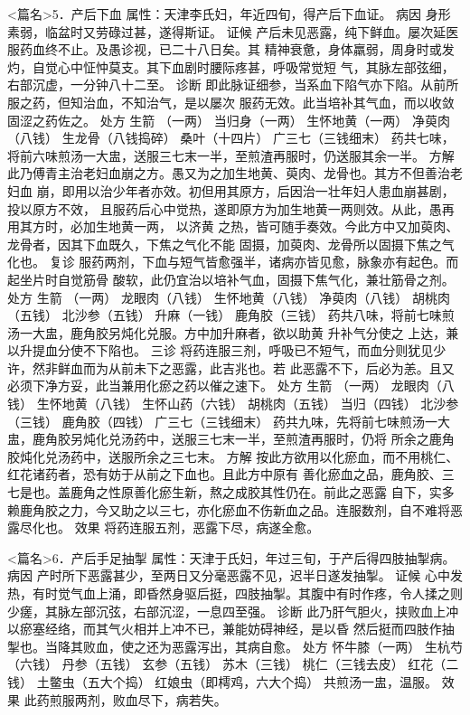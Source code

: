 \documentclass[a4paper,12pt,UTF8,twoside]{ctexbook}
\begin{document}
<篇名>5．产后下血
属性：天津李氏妇，年近四旬，得产后下血证。 
病因 身形素弱，临盆时又劳碌过甚，遂得斯证。 
证候 产后未见恶露，纯下鲜血。屡次延医服药血终不止。及愚诊视，已二十八日矣。其 
精神衰惫，身体羸弱，周身时或发灼，自觉心中怔忡莫支。其下血剧时腰际疼甚，呼吸常觉短 
气，其脉左部弦细，右部沉虚，一分钟八十二至。 
诊断 即此脉证细参，当系血下陷气亦下陷。从前所服之药，但知治血，不知治气，是以屡次 
服药无效。此当培补其气血，而以收敛固涩之药佐之。 
处方 生箭 （一两） 当归身（一两） 生怀地黄（一两） 净萸肉（八钱） 
生龙骨（八钱捣碎） 桑叶（十四片） 广三七（三钱细末） 
药共七味，将前六味煎汤一大盅，送服三七末一半，至煎渣再服时，仍送服其余一半。 
方解 此乃傅青主治老妇血崩之方。愚又为之加生地黄、萸肉、龙骨也。其方不但善治老妇血 
崩，即用以治少年者亦效。初但用其原方，后因治一壮年妇人患血崩甚剧，投以原方不效， 
且服药后心中觉热，遂即原方为加生地黄一两则效。从此，愚再用其方时，必加生地黄一两， 
以济黄 之热，皆可随手奏效。今此方中又加萸肉、龙骨者，因其下血既久，下焦之气化不能 
固摄，加萸肉、龙骨所以固摄下焦之气化也。 
复诊 服药两剂，下血与短气皆愈强半，诸病亦皆见愈，脉象亦有起色。而起坐片时自觉筋骨 
酸软，此仍宜治以培补气血，固摄下焦气化，兼壮筋骨之剂。 
处方 生箭 （一两） 龙眼肉（八钱） 生怀地黄（八钱） 净萸肉（八钱） 
胡桃肉（五钱） 北沙参（五钱） 升麻（一钱） 鹿角胶（三钱） 
药共八味，将前七味煎汤一大盅，鹿角胶另炖化兑服。方中加升麻者，欲以助黄 升补气分使之 
上达，兼以升提血分使不下陷也。 
三诊 将药连服三剂，呼吸已不短气，而血分则犹见少许，然非鲜血而为从前未下之恶露，此吉兆也。若 
此恶露不下，后必为恙。且又必须下净方妥，此当兼用化瘀之药以催之速下。 
处方 生箭 （一两） 龙眼肉（八钱） 生怀地黄（八钱） 生怀山药（六钱） 
胡桃肉（五钱） 当归（四钱） 北沙参（三钱） 鹿角胶（四钱） 
广三七（三钱细末） 
药共九味，先将前七味煎汤一大盅，鹿角胶另炖化兑汤药中，送服三七末一半，至煎渣再服时，仍将 
所余之鹿角胶炖化兑汤药中，送服所余之三七末。 
方解 按此方欲用以化瘀血，而不用桃仁、红花诸药者，恐有妨于从前之下血也。且此方中原有 
善化瘀血之品，鹿角胶、三七是也。盖鹿角之性原善化瘀生新，熬之成胶其性仍在。前此之恶露 
自下，实多赖鹿角胶之力，今又助之以三七，亦化瘀血不伤新血之品。连服数剂，自不难将恶露尽化也。 
效果 将药连服五剂，恶露下尽，病遂全愈。 


<篇名>6．产后手足抽掣
属性：天津于氏妇，年过三旬，于产后得四肢抽掣病。 
病因 产时所下恶露甚少，至两日又分毫恶露不见，迟半日遂发抽掣。 
证候 心中发热，有时觉气血上涌，即昏然身驱后挺，四肢抽掣。其腹中有时作疼，令人揉之则 
少瘥，其脉左部沉弦，右部沉涩，一息四至强。 
诊断 此乃肝气胆火，挟败血上冲以瘀塞经络，而其气火相并上冲不已，兼能妨碍神经，是以昏 
然后挺而四肢作抽掣也。当降其败血，使之还为恶露泻出，其病自愈。 
处方 怀牛膝（一两） 生杭芍（六钱） 丹参（五钱） 玄参（五钱） 
苏木（三钱） 桃仁（三钱去皮） 红花（二钱） 土鳖虫（五大个捣） 红娘虫（即樗鸡，六大个捣） 
共煎汤一盅，温服。 
效果 此药煎服两剂，败血尽下，病若失。 
\end{document}
